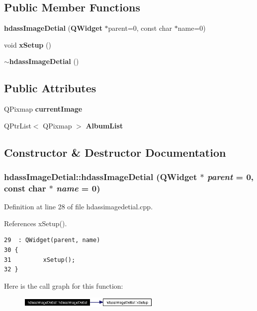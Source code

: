 \subsection*{Public Member Functions}
\begin{CompactItemize}
\item 
{\bf hdass\-Image\-Detial} ({\bf QWidget} $\ast$parent=0, const char $\ast$name=0)
\item 
void {\bf x\-Setup} ()
\item 
{\bf $\sim$hdass\-Image\-Detial} ()
\end{CompactItemize}
\subsection*{Public Attributes}
\begin{CompactItemize}
\item 
QPixmap {\bf current\-Image}
\item 
QPtr\-List$<$ QPixmap $>$ {\bf Album\-List}
\end{CompactItemize}


\subsection{Constructor \& Destructor Documentation}
\subsubsection{\setlength{\rightskip}{0pt plus 5cm}hdass\-Image\-Detial::hdass\-Image\-Detial ({\bf QWidget} $\ast$ {\em parent} = 0, const char $\ast$ {\em name} = 0)}\label{classhdassImageDetial_hdassImageDetiala0}




Definition at line 28 of file hdassimagedetial.cpp.

References x\-Setup().



\footnotesize\begin{verbatim}29  : QWidget(parent, name)
30 {
31         xSetup();
32 }
\end{verbatim}\normalsize 


Here is the call graph for this function:\begin{figure}[H]
\begin{center}
\leavevmode
\includegraphics[width=194pt]{classhdassImageDetial_hdassImageDetiala0_cgraph}
\end{center}
\end{figure}
